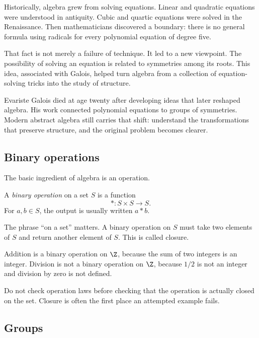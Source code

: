 Historically, algebra grew from solving equations. Linear and quadratic equations
were understood in antiquity. Cubic and quartic equations were solved in the
Renaissance. Then mathematicians discovered a boundary: there is no general
formula using radicals for every polynomial equation of degree five.

That fact is not merely a failure of technique. It led to a new viewpoint. The
possibility of solving an equation is related to symmetries among its roots.
This idea, associated with Galois, helped turn algebra from a collection of
equation-solving tricks into the study of structure.

\begin{historybox}
Evariste Galois died at age twenty after developing ideas that later reshaped
algebra. His work connected polynomial equations to groups of symmetries. Modern
abstract algebra still carries that shift: understand the transformations that
preserve structure, and the original problem becomes clearer.
\end{historybox}

\subsection{Binary operations}

The basic ingredient of algebra is an operation.

\begin{definition}
A \emph{binary operation} on a set $S$ is a function
\[
\ast:S\times S\to S.
\]
For $a,b\in S$, the output is usually written $a\ast b$.
\end{definition}

The phrase ``on a set'' matters. A binary operation on $S$ must take two elements
of $S$ and return another element of $S$. This is called closure.

\begin{example}
Addition is a binary operation on $\Z$, because the sum of two integers is an
integer. Division is not a binary operation on $\Z$, because $1/2$ is not an
integer and division by zero is not defined.
\end{example}

\begin{trapbox}
Do not check operation laws before checking that the operation is actually
closed on the set. Closure is often the first place an attempted example fails.
\end{trapbox}

\subsection{Groups}

